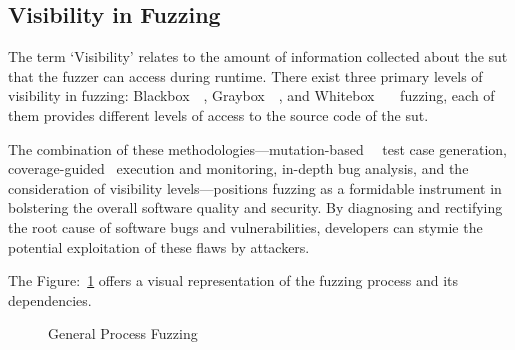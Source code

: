 \subsection*{Visibility in Fuzzing}

The term `Visibility' relates to the amount of information collected about the
\acrshort{sut} that the fuzzer can access during runtime.
There exist three primary levels of visibility in
fuzzing: Blackbox~\cite{godefroid2007random}~\cite{manes2019art},
Graybox~\cite{canakci2021directfuzz}~\cite{li2018fuzzing}, and
Whitebox~\cite{godefroid2008automated}~\cite{godefroid2007random}~\cite{godefroid2008grammar} fuzzing,
each of them provides different levels of access to the source code of the \acrshort{sut}.

The combination of these methodologies—mutation-based~\cite{lyu2022ems}~\cite{miller2007analysis}
test case generation, coverage-guided~\cite{jaaskela2016genetic} execution and monitoring, in-depth bug analysis,
and the consideration of visibility levels—positions fuzzing as a formidable instrument
in bolstering the overall software quality and security. By diagnosing and
rectifying the root cause of software bugs and vulnerabilities, developers
can stymie the potential exploitation of these flaws by attackers.

The Figure:~\ref{fig:general_process_fuzzing} offers a visual representation of the
fuzzing process and its dependencies.



\begin{figure}[h]
        \centering
        {}
        \caption{General Process Fuzzing~\cite{liang2018fuzzing}}\label{fig:general_process_fuzzing}
\end{figure}

